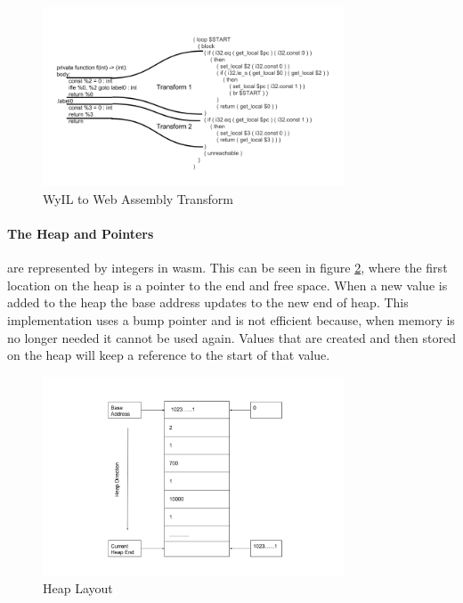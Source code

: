 \begin{figure}[H]
  \centering
  \includegraphics[width=0.8\textwidth]{StatementTransform}
  \caption{WyIL to Web Assembly Transform}
  \label{fig:wtw}
\end{figure}

\paragraph{The Heap and Pointers}
are represented by integers in wasm. This can be seen in figure \ref{fig:hlo}, where the first location on the heap is a pointer to the end and free space. When a new value is added to the heap the base address updates to the new end of heap. This implementation uses a bump pointer and is not efficient because, when memory is no longer needed it cannot be used again. Values that are created and then stored on the heap will keep a reference to the start of that value.

\begin{figure}[H]
  \centering
  \includegraphics[width=0.8\textwidth]{HeapLayout}
  \caption{Heap Layout}
  \label{fig:hlo}
\end{figure}

